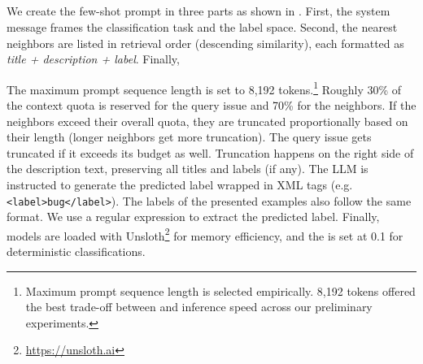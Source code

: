 
\subsection{\ragtag}
\label{sec:approach-ragtag}
We create the few-shot prompt in three parts as shown in . First, the system message frames the classification task and the label space. Second, the  nearest neighbors are listed in retrieval order (descending similarity), each formatted as \textit{title + description + label}. Finally, 

 The maximum prompt sequence length is set to 8,192 tokens.\footnote{Maximum prompt sequence length is selected empirically. 8,192 tokens offered the best trade-off between  and inference speed across our preliminary experiments.} Roughly 30\% of the context quota is reserved for the query issue and 70\% for the neighbors. If the neighbors exceed their overall quota, they are truncated proportionally based on their length (longer neighbors get more truncation). The query issue gets truncated if it exceeds its budget as well. Truncation happens on the right side of the
description text, preserving all titles and labels (if any).
The LLM is instructed to generate the predicted label wrapped in XML tags (e.g. \texttt{<label>bug</label>}). The labels of the presented examples also follow the same format. We use a regular expression to extract the predicted label.  Finally, models are loaded with Unsloth\footnote{\url{https://unsloth.ai}} for memory efficiency, and the  is set at 0.1 for deterministic classifications.
